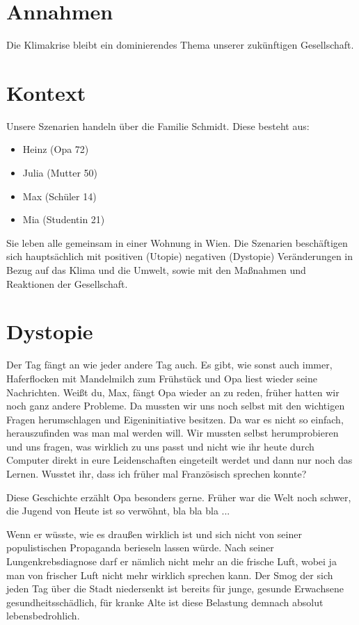 \documentclass[twoside, a4paper, DIV=11, open=any, bibliography=totoc]{scrbook}
\newcommand{\Quote}[1]{\glqq #1\grqq{}}
\begin{document}
\section{Annahmen} \label{sec:szenannahmen}

Die Klimakrise bleibt ein dominierendes Thema unserer zukünftigen Gesellschaft.

\section{Kontext} \label{sec:szenkontext}

Unsere Szenarien handeln über die Familie Schmidt. Diese besteht aus:
\begin{itemize}
    \item Heinz (Opa 72)
    \item Julia (Mutter 50)
    \item Max (Schüler 14)
    \item Mia (Studentin 21)
\end{itemize}
Sie leben alle gemeinsam in einer Wohnung in Wien. 
Die Szenarien beschäftigen sich hauptsächlich mit positiven (Utopie) 
negativen (Dystopie) Veränderungen in Bezug auf das Klima und die Umwelt,
sowie mit den Maßnahmen und Reaktionen der Gesellschaft.


\section{Dystopie} \label{sec:szendystopie}

Der Tag fängt an wie jeder andere Tag auch. Es gibt, wie sonst auch immer,
Haferflocken mit Mandelmilch zum Frühstück und Opa liest wieder
seine Nachrichten. \Quote{Weißt du, Max}, fängt Opa wieder an zu reden, 
\Quote{früher hatten
wir noch ganz andere
Probleme. Da mussten wir uns noch selbst mit den wichtigen Fragen herumschlagen und
Eigeninitiative besitzen.
Da war es nicht so einfach, herauszufinden was man mal werden will. Wir mussten
selbst herumprobieren und
uns fragen, was wirklich zu uns passt und nicht wie ihr heute durch Computer direkt
in eure Leidenschaften
eingeteilt werdet und dann nur noch das Lernen. Wusstet ihr, dass ich früher mal
Französisch sprechen konnte?}

Diese Geschichte erzählt Opa besonders gerne.
\Quote{Früher war die Welt noch schwer, die
Jugend von Heute ist so
verwöhnt, bla bla bla ...}

Wenn er wüsste, wie es draußen wirklich ist und sich nicht von seiner
populistischen Propaganda berieseln lassen würde.
Nach seiner Lungenkrebsdiagnose darf er nämlich nicht mehr an die frische Luft,
wobei ja man von frischer Luft nicht mehr wirklich sprechen kann.
Der Smog der sich jeden Tag über die Stadt niedersenkt ist bereits für
junge, gesunde Erwachsene gesundheitsschädlich, für kranke Alte ist diese
Belastung demnach absolut lebensbedrohlich.
\end{document}
